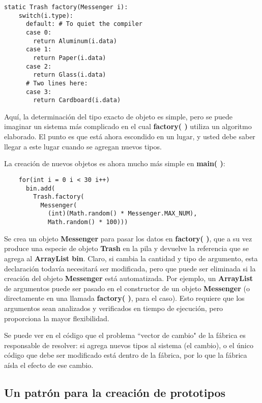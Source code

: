 \begin{lstlisting}
static Trash factory(Messenger i): 
    switch(i.type): 
      default: # To quiet the compiler 
      case 0: 
        return Aluminum(i.data) 
      case 1: 
        return Paper(i.data) 
      case 2: 
        return Glass(i.data) 
      # Two lines here: 
      case 3:  
        return Cardboard(i.data)
\end{lstlisting}

Aquí, la determinación del tipo exacto de objeto es simple, pero se puede imaginar un sistema más complicado en el cual \textbf{factory( )} utiliza un algoritmo elaborado. El punto es que está ahora escondido en un lugar, y usted debe saber llegar a este lugar cuando se agregan nuevos tipos.  \newline

La creación de nuevos objetos es ahora mucho más simple en \textbf{main( )}:    \newline

\begin{lstlisting} 
    for(int i = 0 i < 30 i++) 
      bin.add( 
        Trash.factory( 
          Messenger( 
            (int)(Math.random() * Messenger.MAX_NUM), 
            Math.random() * 100))) 
\end{lstlisting}

Se crea un objeto \textbf{Messenger} para pasar los datos en \textbf{factory( )},
que a su vez produce una especie de objeto \textbf{Trash} en la pila y devuelve la referencia que se agrega al \textbf{ArrayList bin}. Claro, si cambia la cantidad y tipo de argumento, esta declaración todavía necesitará ser modificada, pero que puede ser eliminada si la creación del objeto \textbf{Messenger} está automatizada. Por ejemplo, un \textbf{ArrayList} de argumentos puede ser pasado en el constructor de un objeto \textbf{Messenger} (o directamente en una llamada \textbf{factory( )}, para el caso). Esto requiere que los argumentos sean analizados y verificados en tiempo de ejecución, pero proporciona la mayor flexibilidad.    \newline

Se puede ver en el código que el problema “vector de cambio" de la fábrica es responsable de resolver: si agrega nuevos tipos al sistema (el cambio), o el único código que debe ser modificado está dentro de la fábrica, por lo que la fábrica aísla el efecto de ese cambio. \newline

\subsection*{Un patrón para la creación de prototipos}
\label{subsec:upplcdp}

